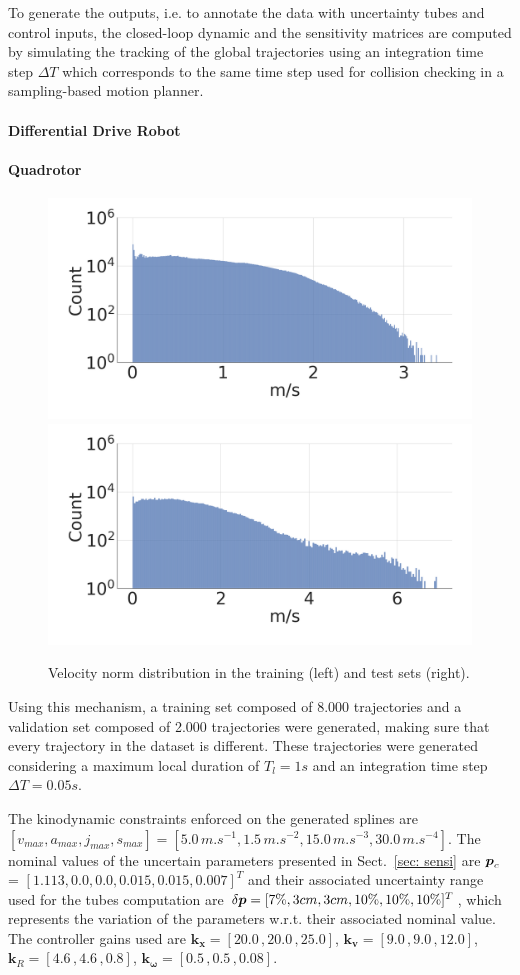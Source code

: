 To generate the outputs, i.e. to annotate the data with uncertainty tubes and control inputs, the closed-loop dynamic and the sensitivity matrices are computed by simulating the tracking of the global trajectories using an integration time step $\Delta T$ which corresponds to the same time step used for collision checking in a sampling-based motion planner.

\paragraph{Differential Drive Robot}

\paragraph{Quadrotor}

\begin{figure} [t]
    \centering
    \includegraphics[width=0.49\linewidth]{figures/learning_quadrotor/vnorm_val2.png}
    \includegraphics[width=0.49\linewidth]{figures/learning_quadrotor/vnorm_test.png}
    \caption{Velocity norm distribution in the training (left) and test sets (right).}%
    \label{fig: valvstest}%
\end{figure}
Using this mechanism, a training set composed of 8.000 trajectories and a validation set composed of 2.000 trajectories were generated, making sure that every trajectory in the dataset is different.
These trajectories were generated considering a maximum local duration of $T_l = 1s$ and an integration time step $\Delta T = 0.05s$.

The kinodynamic constraints enforced on the generated splines are $[v_{max}, a_{max}, j_{max}, s_{max}] = [5.0 \, m.s^{-1}, \allowbreak 1.5 \, m.s^{-2}, \allowbreak 15.0 \, m.s^{-3}, \allowbreak 30.0 \, m.s^{-4}]$. 
The nominal values of the uncertain parameters presented in Sect.~\ref{sec: sensi} are $\boldsymbol{p}_{c}$ = $[1.113, \allowbreak0.0, \allowbreak0.0, \allowbreak0.015, \allowbreak0.015, \allowbreak0.007]^T$ and their associated uncertainty range used for the tubes computation are $\delta\boldsymbol{p} = [7\%, \allowbreak3cm, \allowbreak3cm, \allowbreak10\%, \allowbreak10\%, \allowbreak10\%]^T$, which represents the variation of the parameters w.r.t. their associated nominal value.
The controller gains used are $\boldsymbol{k_x}=[20.0 \,, \allowbreak 20.0 \,, \allowbreak 25.0]$, $\boldsymbol{k_v}=[9.0 \,, \allowbreak 9.0 \,, \allowbreak 12.0]$, $\boldsymbol{k}_{R}=[4.6 \,, 4.6 \,, 0.8]$, $\boldsymbol{k_{\omega}}=[0.5 \,, \allowbreak 0.5 \,, \allowbreak 0.08]$.

